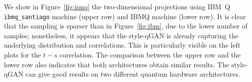 \documentclass[twocolumn,preprintnumbers,superscriptaddress]{revtex4-2}
\begin{document}
We show in Figure~\ref{fig:ionq} the two-dimensional projections using
IBM~Q  {\tt ibmq\_santiago} machine (upper row) and IBMQ machine (lower row).
It is clear that the sampling is sparser than in Figure~\ref{fig:ibm}, due to the lower number of
samples; nonetheless, it appears that the style-qGAN is already capturing the underlying
distribution and correlations. This is particularly visible on the left plots for the $t-s$ correlation.
The comparison between the upper row and the lower row also indicates that both architectures
obtain similar results. The style-qGAN can give good results on two different quantum hardware
architectures.



\end{document}
